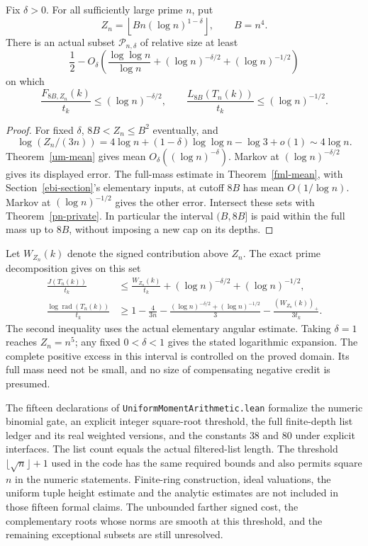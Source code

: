 \begin{corollary}
\label{um-domain}
Fix \(\delta>0\). For all sufficiently large prime \(n\), put
\[
 Z_n=\left\lfloor Bn(\log n)^{1-\delta}\right\rfloor,\qquad B=n^4.
\]
There is an actual subset \(\mathcal P_{n,\delta}\) of relative
size at least
\[
 \frac12-
 O_\delta\!\left(\frac{\log\log n}{\log n}
                  +(\log n)^{-\delta/2}+(\log n)^{-1/2}\right)
\]
on which
\[
 \frac{F_{8B,Z_n}(k)}{t_k}\leq(\log n)^{-\delta/2},\qquad
 \frac{L_{8B}(T_n(k))}{t_k}\leq(\log n)^{-1/2}.
\]
\end{corollary}
\begin{proof}
For fixed \(\delta\), \(8B<Z_n\leq B^2\) eventually, and
\[
 \log(Z_n/(3n))
   =4\log n+(1-\delta)\log\log n-\log3+o(1)
   \sim4\log n.
\]
Theorem~\ref{um-mean} gives mean \(O_\delta((\log n)^{-\delta})\).
Markov at \((\log n)^{-\delta/2}\) gives its displayed error.
The full-mass estimate in Theorem~\ref{fml-mean}, with
Section~\ref{ebi-section}'s elementary inputs, at cutoff \(8B\)
has mean \(O(1/\log n)\).
Markov at \((\log n)^{-1/2}\) gives the other error. Intersect
these sets with Theorem~\ref{pn-private}.
In particular the interval \((B,8B]\) is paid within the full
mass up to \(8B\), without imposing a new cap on its depths.
\end{proof}

Let \(W_{Z_n}(k)\) denote the signed contribution above \(Z_n\).
The exact prime decomposition gives on this set
\begin{align}
 \frac{J(T_n(k))}{t_k}
 &\leq\frac{W_{Z_n}(k)}{t_k}
                   +(\log n)^{-\delta/2}+(\log n)^{-1/2},
       \label{um-signed}\\
 \frac{\log\operatorname{rad}(T_n(k))}{t_k}
 &\geq1-\frac4{3n}
       -\frac{(\log n)^{-\delta/2}+(\log n)^{-1/2}}3
       -\frac{(W_{Z_n}(k))_+}{3t_k}. \label{um-radical}
\end{align}
The second inequality uses the actual elementary angular estimate.
Taking \(\delta=1\) reaches \(Z_n=n^5\); any fixed \(0<\delta<1\)
gives the stated logarithmic expansion.
The complete positive excess in this interval is controlled on
the proved domain. Its full mass need not be small, and no size
of compensating negative credit is presumed.

The fifteen declarations of
\texttt{UniformMoment\allowbreak Arithmetic.lean} formalize the
numeric binomial gate, an explicit integer square-root threshold,
the full finite-depth list ledger and its real weighted versions,
and the constants \(38\) and \(80\) under explicit interfaces.
The list count equals the actual filtered-list length.
The threshold \(\lfloor\sqrt n\rfloor+1\) used in the code has
the same required bounds and also permits square \(n\) in the
numeric statements. Finite-ring construction, ideal valuations,
the uniform tuple height estimate and the analytic estimates are
not included in those fifteen formal claims.
The unbounded farther signed cost, the complementary roots whose
norms are smooth at this threshold, and the remaining exceptional
subsets are still unresolved.
